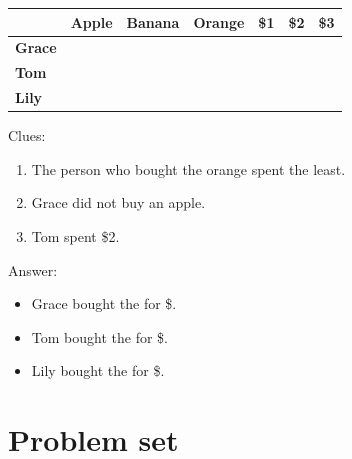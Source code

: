 \documentclass{tufte-book}
\providecommand{\tabularnewline}{\\}
\begin{document}
\begin{enumerate}
\begin{tabular}{|l|>{\centering}p{1.5cm}|>{\centering}p{1.5cm}|>{\centering}p{1.5cm}|>{\centering}p{1.5cm}|>{\centering}p{1.5cm}|>{\centering}p{1.5cm}|}
\hline 
 & \textbf{Apple} & \textbf{Banana} & \textbf{Orange} & \textbf{\$1} & \textbf{\$2} & \textbf{\$3}\tabularnewline
\hline 
\hline 
\textbf{Grace} &  &  &  &  &  & \tabularnewline
\hline 
\textbf{Tom} &  &  &  &  &  & \tabularnewline
\hline 
\textbf{Lily} &  &  &  &  &  & \tabularnewline
\hline 
\end{tabular}

Clues:
\begin{enumerate}
\item The person who bought the orange spent the least.
\item Grace did not buy an apple.
\item Tom spent \$2.
\end{enumerate}

Answer:\bigskip
\begin{itemize}
\item Grace bought the \dotfill\bigskip for \$\dotfill\bigskip.
\item Tom bought the \dotfill\bigskip for \$\dotfill\bigskip.
\item Lily bought the \dotfill\bigskip for \$\dotfill\bigskip.
\end{itemize}

\end{enumerate}

\clearpage\section{Problem set }
\end{document}
